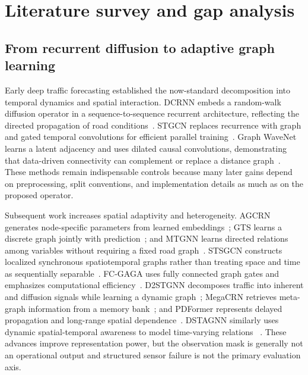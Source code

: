 \documentclass[preprint,12pt]{elsarticle}
\begin{document}
\section{Literature survey and gap analysis}
\subsection{From recurrent diffusion to adaptive graph learning}
Early deep traffic forecasting established the now-standard decomposition into
temporal dynamics and spatial interaction. DCRNN embeds a random-walk diffusion
operator in a sequence-to-sequence recurrent architecture, reflecting the
directed propagation of road conditions~\cite{li2018dcrnn}. STGCN replaces
recurrence with graph and gated temporal convolutions for efficient parallel
training~\cite{yu2018stgcn}. Graph WaveNet learns a latent adjacency and uses
dilated causal convolutions, demonstrating that data-driven connectivity can
complement or replace a distance graph~\cite{wu2019graphwavenet}. These methods
remain indispensable controls because many later gains depend on preprocessing,
split conventions, and implementation details as much as on the proposed
operator.

Subsequent work increases spatial adaptivity and heterogeneity. AGCRN generates
node-specific parameters from learned embeddings~\cite{bai2020agcrn}; GTS
learns a discrete graph jointly with prediction~\cite{shang2021gts}; and MTGNN
learns directed relations among variables without requiring a fixed road
graph~\cite{wu2020mtgnn}. STSGCN constructs localized synchronous
spatiotemporal graphs rather than treating space and time as sequentially
separable~\cite{song2020stsgcn}. FC-GAGA uses fully connected graph gates and
emphasizes computational efficiency~\cite{oreshkin2021fcgaga}. D2STGNN
decomposes traffic into inherent and diffusion signals while learning a dynamic
graph~\cite{shao2022d2stgnn}; MegaCRN retrieves meta-graph information from a
memory bank~\cite{jiang2023megacrn}; and PDFormer represents delayed propagation
and long-range spatial dependence~\cite{jiang2023pdformer}. DSTAGNN similarly
uses dynamic spatial-temporal awareness to model time-varying relations
~\cite{lan2022dstagnn}. These advances improve representation power, but the
observation mask is generally not an operational output and structured sensor
failure is not the primary evaluation axis.
\end{document}
